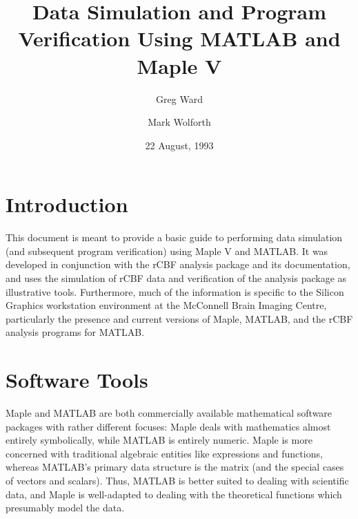 
\title{Data Simulation and Program Verification Using MATLAB and Maple V}
\author{Greg Ward \and Mark Wolforth}
\date{22 August, 1993}

\def\code#1{{\tt #1}}

\def\simuldir{~greg/matlab/testing}
\newcommand{\units}[1]{\mbox{$\rm{#1}$}}
\newcommand{\funits}[2]{\mbox{$\rm\frac{#1}{#2}$}}



\maketitle

\tableofcontents

\section{Introduction}

This document is meant to provide a basic guide to performing data
simulation (and subsequent program verification) using Maple V and
MATLAB.  It was developed in conjunction with the rCBF analysis
package and its documentation, and uses the simulation of rCBF data
and verification of the analysis package as illustrative tools.
Furthermore, much of the information is specific to the Silicon
Graphics workstation environment at the McConnell Brain Imaging
Centre, particularly the presence and current versions of Maple,
MATLAB, and the rCBF analysis programs for MATLAB.

\section{Software Tools}

Maple and MATLAB are both commercially available mathematical software
packages with rather different focuses: Maple deals with mathematics
almost entirely symbolically, while MATLAB is entirely numeric.  Maple
is more concerned with traditional algebraic entities like expressions
and functions, whereas MATLAB's primary data structure is the matrix
(and the special cases of vectors and scalars).  Thus, MATLAB is
better suited to dealing with scientific data, and Maple is well-adapted
to dealing with the theoretical functions which presumably model the
data.


